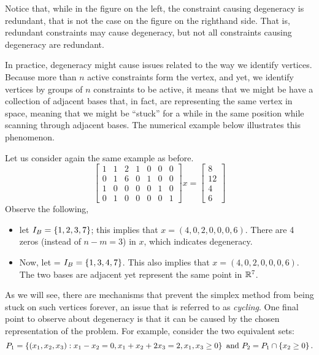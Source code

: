 Notice that, while in the figure on the left, the constraint causing degeneracy is redundant, that is not the case on the figure on the righthand side. That is, redundant constraints may cause degeneracy, but not all constraints causing degeneracy are redundant.

In practice, degeneracy might cause issues related to the way we identify vertices. Because more than $n$ active constraints form the vertex, and yet, we identify vertices by groups of $n$ constraints to be active, it means that we might be have a collection of adjacent bases that, in fact, are representing the same vertex in space, meaning that we might be ``stuck'' for a while in the same position while scanning through adjacent bases. The numerical example below illustrates this phenomenon. 

Let us consider again the same example as before. 
%
\begin{equation*}
	\begin{bmatrix}
		1 & 1 & 2 & 1 & 0 & 0 & 0 \\
		0 & 1 & 6 & 0 & 1 & 0 & 0 \\
		1 & 0 & 0 & 0 & 0 & 1 & 0 \\
		0 & 1 & 0 & 0 & 0 & 0 & 1
	\end{bmatrix} 
	x =
	\begin{bmatrix}
		8  \\
		12 \\
		4  \\
		6   	
	\end{bmatrix}
\end{equation*}
%
Observe the following, 
%
\begin{itemize}
	\item let $I_B = \left\{ 1,2,3,7 \right \}$; this implies that $x = (4,0,2,0,0,0,6)$. There are 4 zeros (instead of $n-m=3$) in $x$, which indicates degeneracy. 
	\item Now, let = $I_B = \left\{ 1,3,4,7 \right \}$. This also implies that $x = (4,0,2,0,0,0,6)$. The two bases are adjacent yet represent the same point in $\mathbb{R}^7$.	
\end{itemize}
%
As we will see, there are mechanisms that prevent the simplex method from being stuck on such vertices forever, an issue that is referred to as \emph{cycling}. One final point to observe about degeneracy is that it can be caused by the chosen representation of the problem. For example, consider the two equivalent sets:
%
\begin{equation*}
	P_1 = \left\{ (x_1, x_2,x_3) : x_1 - x_2 = 0, x_1 + x_2 + 2x_3 = 2, x_1, x_3 \geq 0 \right \} \text { and } P_2 = P_1 \cap \left\{ x_2 \geq 0 \right \}. 
\end{equation*}	
